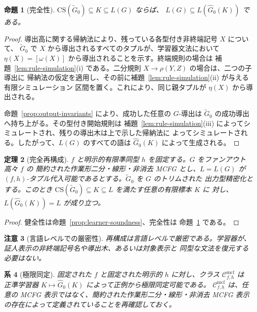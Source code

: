 \documentclass[11pt,a4paper]{ltjsarticle}
\newtheorem{theorem}{定理}[section]
\newtheorem{proposition}[theorem]{命題}
\newtheorem{corollary}[theorem]{系}
\newtheorem{remark}[theorem]{注意}
\theoremstyle{remark}
\newcommand{\CS}{\mathrm{CS}}
\newcommand{\Cmcf}[2]{\mathcal{C}^{\mathrm{mcf}}_{#1,#2}}
\begin{document}
\begin{proposition}[完全性]
\label{prop:completeness}
\(\CS(\widetilde G_0)\subseteq K\subseteq L(G)\) ならば、
\(L(G)\subseteq L(\widehat G_0(K))\) である。
\end{proposition}

\begin{proof}
導出高に関する帰納法により、残っている各型付き非終端記号 \(X\) について、
\(\widetilde G_0\) で \(X\) から導出されるすべてのタプルが、学習器文法において
\(\eta(X)=[\omega(X)]\) から導出されることを示す。終端規則の場合は
補題~\ref{lem:rule-simulation}(i) である。二分規則 \(X\to\rho(Y,Z)\) の場合は、二つの子導出に
帰納法の仮定を適用し、その前に補題~\ref{lem:rule-simulation}(ii) が与える有限シミュレーション
区間を置く。これにより、同じ親タプルが \(\eta(X)\) から導出される。

命題~\ref{prop:output-invariants} により、成功した任意の \(G\)-導出は
\(\widetilde G_0\) の成功導出へ持ち上がる。その型付き開始規則は
補題~\ref{lem:rule-simulation}(iii) によってシミュレートされ、残りの導出木は上で示した帰納法に
よってシミュレートされる。したがって、\(L(G)\) のすべての語は
\(\widehat G_0(K)\) によって生成される。
\end{proof}

\begin{theorem}[完全再構成]
\label{thm:exact-reconstruction}
\(f\) と明示的有限準同型 \(h\) を固定する。\(G\) をファンアウト高々 \(f\) の
簡約された作業形二分・線形・非消去 MCFG とし、\(L=L(G)\) が
\((f,h)\)-タプル代入可能であるとする。\(\widetilde G_0\) を \(G\) のトリムされた
出力型精密化とする。このとき
\(\CS(\widetilde G_0)\subseteq K\subseteq L\) を満たす任意の有限標本 \(K\) に
対し、\(L(\widehat G_0(K))=L\) が成り立つ。
\end{theorem}

\begin{proof}
健全性は命題~\ref{prop:learner-soundness}、完全性は
命題~\ref{prop:completeness} である。
\end{proof}

\begin{remark}[言語レベルでの厳密性]
\label{rem:language-level-exactness}
再構成は言語レベルで厳密である。学習器が、証人表示の非終端記号名や導出木、あるいは対象表示と
同型な文法を復元する必要はない。
\end{remark}

\begin{corollary}[極限同定]
\label{cor:gold}
固定された \(f\) と固定された明示的 \(h\) に対し、クラス \(\Cmcf{f}{h}\) は
正準学習器 \(K\mapsto\widehat G_0(K)\) によって正例から極限同定可能である。
\(\Cmcf{f}{h}\) は、任意の MCFG 表示ではなく、簡約された作業形二分・線形・非消去
MCFG 表示の存在によって定義されていることを再確認しておく。
\end{corollary}
\end{document}
